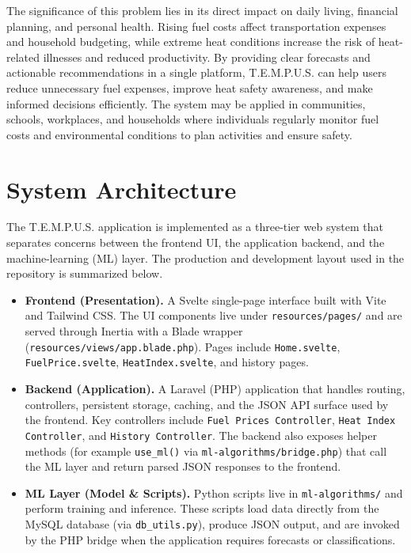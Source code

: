\documentclass[12pt]{article}
\begin{document}
The significance of this problem lies in its direct impact on daily living, financial planning, and personal health. Rising fuel costs affect transportation expenses and household budgeting, while extreme heat conditions increase the risk of heat-related illnesses and reduced productivity. By providing clear forecasts and actionable recommendations in a single platform, T.E.M.P.U.S. can help users reduce unnecessary fuel expenses, improve heat safety awareness, and make informed decisions efficiently. The system may be applied in communities, schools, workplaces, and households where individuals regularly monitor fuel costs and environmental conditions to plan activities and ensure safety.

\section{System Architecture}

The T.E.M.P.U.S. application is implemented as a three-tier web system that separates concerns between the frontend UI, the application backend, and the machine-learning (ML) layer. The production and development layout used in the repository is summarized below.

\begin{itemize}
    \item \textbf{Frontend (Presentation).} A Svelte single-page interface built with Vite and Tailwind CSS. The UI components live under \texttt{resources/pages/} and are served through Inertia with a Blade wrapper (\texttt{resources/views/app.blade.php}). Pages include \texttt{Home.svelte}, \texttt{FuelPrice.svelte}, \texttt{HeatIndex.svelte}, and history pages.

    \item \textbf{Backend (Application).} A Laravel (PHP) application that handles routing, controllers, persistent storage, caching, and the JSON API surface used by the frontend. Key controllers include \texttt{Fuel Prices Controller}, \texttt{Heat Index Controller}, and \texttt{History Controller}. The backend also exposes helper methods (for example \texttt{use\_ml()} via \texttt{ml-algorithms/bridge.php}) that call the ML layer and return parsed JSON responses to the frontend.

    \item \textbf{ML Layer (Model \& Scripts).} Python scripts live in \texttt{ml-algorithms/} and perform training and inference. These scripts load data directly from the MySQL database (via \texttt{db\_utils.py}), produce JSON output, and are invoked by the PHP bridge when the application requires forecasts or classifications.
\end{itemize}
\end{document}
